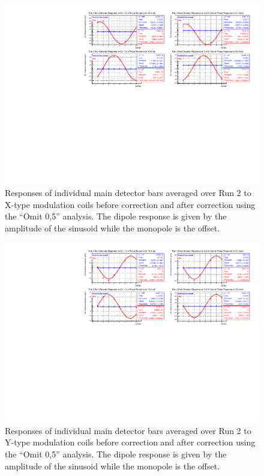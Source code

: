 \begin{landscape}
\begin{figure}[!ht]
\begin{center}
\includegraphics[width=9in]{./Pictures/Run2_X_dipoleOmit05.pdf}
\caption{\label{fig:Run2_Omit05_Xdipoles_app}Responses of individual main detector bars averaged over Run 2 to X-type modulation coils before correction and after correction using the ``Omit 0,5'' analysis. The dipole response is given by the amplitude of the sinusoid while the monopole is the offset.}
\end{center}
\end{figure}

\begin{figure}[!ht]
\begin{center}
\includegraphics[width=9in]{./Pictures/Run2_Y_dipoleOmit05.pdf}
\caption{\label{fig:Run2_Omit05_Ydipoles_app}Responses of individual main detector bars averaged over Run 2 to Y-type modulation coils before correction and after correction using the ``Omit 0,5'' analysis. The dipole response is given by the amplitude of the sinusoid while the monopole is the offset.}
\end{center}
\end{figure}


\end{landscape}
